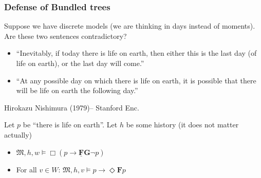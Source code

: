 \documentclass[xcolor=x11names]{beamer}
\newcommand{\FD}{\mathbf F}
\newcommand{\FB}{\mathbf G}
\newcommand{\lthen}{\rightarrow}
\begin{document}
\begin{frame}[t]
	\frametitle{Defense of Bundled trees}
\scriptsize

Suppose we have discrete models (we are thinking in days instead of moments). Are these two sentences contradictory?
\begin{itemize}
\item ``Inevitably, if today there is life on earth, then either this is the last day (of life on earth), or the last day will come.''
\item ``At any possible day on which there is life on earth, it is possible that there will be life on earth the following day.''
\end{itemize}
\hfill {\scriptsize Hirokazu Nishimura (1979)-- Stanford Enc.}

Let $p$ be ``there is life on earth''. Let $h$ be some history (it does not matter actually)
\begin{itemize}
\item $\mathfrak M , h, w\models \Box (p \lthen \underline{\FD} \FB \lnot p)$
\item For all $v\in W$: $\mathfrak M, h, v \models p \lthen \Diamond \FD p$
\end{itemize}

\end{frame}
\end{document}
